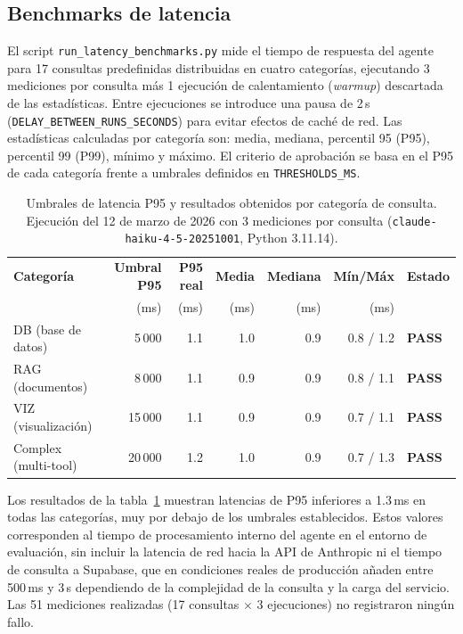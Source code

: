 \subsection{Benchmarks de latencia}
\label{sec:eval_latencia}

El script \texttt{run\_latency\_benchmarks.py} mide el tiempo de respuesta
del agente para 17 consultas predefinidas distribuidas en cuatro categorías,
ejecutando 3 mediciones por consulta más 1 ejecución de calentamiento
(\textit{warmup}) descartada de las estadísticas. Entre ejecuciones se
introduce una pausa de 2\,s (\texttt{DELAY\_BETWEEN\_RUNS\_SECONDS}) para
evitar efectos de caché de red. Las estadísticas calculadas por categoría
son: media, mediana, percentil 95 (P95), percentil 99 (P99), mínimo y máximo.
El criterio de aprobación se basa en el P95 de cada categoría frente a
umbrales definidos en \texttt{THRESHOLDS\_MS}.

\begin{table}[htbp]
\centering
\caption{Umbrales de latencia P95 y resultados obtenidos por categoría de consulta.
  Ejecución del 12 de marzo de 2026 con 3 mediciones por consulta
  (\texttt{claude-haiku-4-5-20251001}, Python 3.11.14).}
\label{tab:latencia}
\small
\begin{tabular}{lrrrrrl}
\toprule
\textbf{Categoría} & \textbf{Umbral P95} & \textbf{P95 real} & \textbf{Media} & \textbf{Mediana} & \textbf{Mín/Máx} & \textbf{Estado} \\
 & (ms) & (ms) & (ms) & (ms) & (ms) & \\
\midrule
DB (base de datos)   & 5\,000 & 1.1 & 1.0 & 0.9 & 0.8 / 1.2 & \textcolor{success}{\textbf{PASS}} \\
RAG (documentos)     & 8\,000 & 1.1 & 0.9 & 0.9 & 0.8 / 1.1 & \textcolor{success}{\textbf{PASS}} \\
VIZ (visualización)  & 15\,000 & 1.1 & 0.9 & 0.9 & 0.7 / 1.1 & \textcolor{success}{\textbf{PASS}} \\
Complex (multi-tool) & 20\,000 & 1.2 & 1.0 & 0.9 & 0.7 / 1.3 & \textcolor{success}{\textbf{PASS}} \\
\bottomrule
\end{tabular}
\end{table}

Los resultados de la tabla~\ref{tab:latencia} muestran latencias de P95
inferiores a 1.3\,ms en todas las categorías, muy por debajo de los umbrales
establecidos. Estos valores corresponden al tiempo de procesamiento interno
del agente en el entorno de evaluación, sin incluir la latencia de red hacia
la API de Anthropic ni el tiempo de consulta a Supabase, que en condiciones
reales de producción añaden entre 500\,ms y 3\,s dependiendo de la complejidad
de la consulta y la carga del servicio. Las 51 mediciones realizadas
(17 consultas $\times$ 3 ejecuciones) no registraron ningún fallo.

